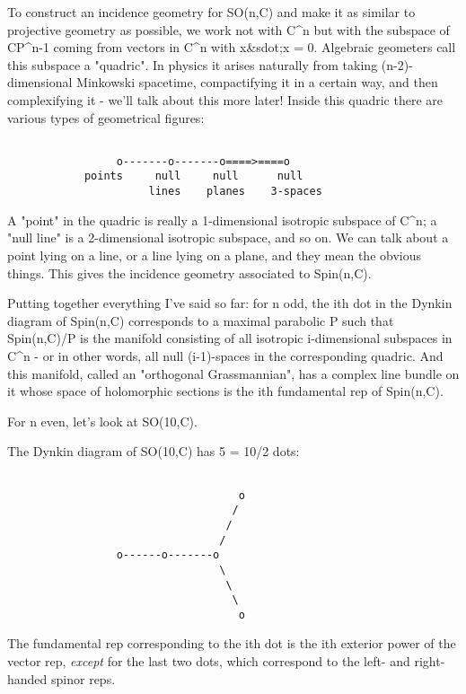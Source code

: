 To construct an incidence geometry for SO(n,C) and make it as similar to
projective geometry as possible, we work not with C^{n} but with the
subspace of CP^{n-1} coming from vectors in C^{n} with 
x&sdot;x = 0.
Algebraic geometers call this subspace a "quadric".  
In physics it arises naturally from taking (n-2)-dimensional
Minkowski spacetime, compactifying it in a certain way, and then 
complexifying it - we'll talk about this more later!
Inside this quadric there are various types of geometrical figures:



\begin{verbatim}

                 o-------o-------o====>====o 
            points     null     null      null
                      lines    planes    3-spaces
\end{verbatim}
    
A "point" in the quadric is really a 1-dimensional isotropic subspace 
of C^{n}; a "null line" is a 2-dimensional isotropic 
subspace, and 
so on.  We can talk about a point lying on a line, or a line lying on a plane,
and they mean the obvious things.  This gives the incidence geometry
associated to Spin(n,C).

Putting together everything I've said so far: for n odd, the ith dot in
the Dynkin diagram of Spin(n,C) corresponds to a maximal parabolic P
such that Spin(n,C)/P is the manifold consisting of all isotropic
i-dimensional subspaces in C^{n} - or in other words, 
all null (i-1)-spaces in the corresponding quadric.  And this manifold, 
called an "orthogonal Grassmannian", has a complex line 
bundle on it whose space of holomorphic sections is the ith fundamental 
rep of Spin(n,C).

For n even, let's look at SO(10,C).

The Dynkin diagram of SO(10,C) has 5 = 10/2 dots:
   

\begin{verbatim}

                                    o 
                                   /
                                  /
                                 /
                 o------o-------o 
                                 \
                                  \
                                   \
                                    o
\end{verbatim}
    
The fundamental rep corresponding to the ith dot is the 
ith exterior power of the vector rep, \emph{except} for the last 
two dots, which correspond to the left- and right-handed
spinor reps.

